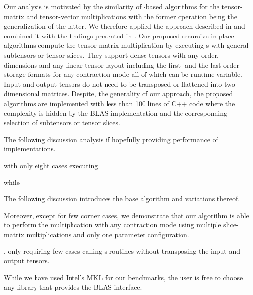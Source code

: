 Our analysis is motivated by the similarity of -based algorithms for the tensor-matrix and tensor-vector multiplications with the former operation being the generalization of the latter.
We therefore applied the approach described in \cite{bassoy:2019:ttv} and combined it with the findings presented in \cite{li:2015:input}.
Our proposed recursive in-place algorithms compute the tensor-matrix multiplication by executing s with general subtensors or tensor slices.
They support dense tensors with any order, dimensions and any linear tensor layout including the first- and the last-order storage formats for any contraction mode all of which can be runtime variable.
Input and output tensors do not need to be transposed or flattened into two-dimensional matrices.
Despite, the generality of our approach, the proposed algorithms are implemented with less than 100 lines of C++ code where the complexity is hidden by the BLAS implementation and the corresponding selection of subtensors or tensor slices.



The following discussion analysis if 
 hopefully providing performance of  implementations.



with only eight cases executing 

while 




The following discussion introduces the base algorithm and variations thereof. 

Moreover, except for few corner cases, we demonstrate that our algorithm is able to perform the multiplication with any contraction mode using multiple slice-matrix multiplications and only one  parameter configuration.

, only requiring few cases calling s routines without transposing the input and output tensors.




While we have used Intel's MKL for our benchmarks, the user is free to choose any library that provides the BLAS interface.

